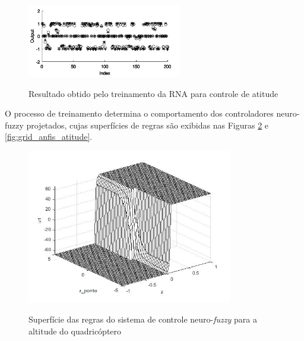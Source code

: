 \begin{figure}[!htb]
    \centering
    \caption{Resultado obtido pelo treinamento da RNA para controle de atitude}
    \includegraphics[width=0.6\textwidth]{./04-figuras/anfisedit/rna_anfis_train_result_atitude}
    \label{fig:rna_anfis_train_result_atitude}
\end{figure}

O processo de treinamento determina o comportamento dos controladores neuro-fuzzy projetados, cujas superfícies de regras são exibidas nas Figuras \ref{fig:grid_anfis_altitude} e \ref{fig:grid_anfis_atitude}.

\begin{figure}[!htb]
    \centering
    \caption{Superfície das regras do sistema de controle neuro-\textit{fuzzy} para a altitude do quadricóptero}
    \includegraphics[width=0.8\textwidth]{./04-figuras/figuras_pos_banca/9-refinando-grids/editados/grid_anfis_altitude}
    \label{fig:grid_anfis_altitude}
\end{figure}

